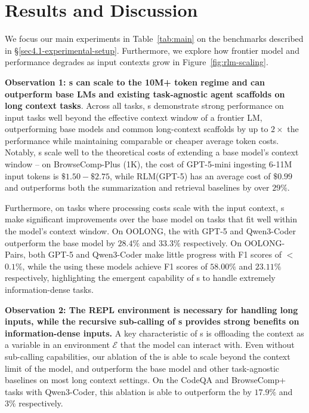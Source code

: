 \section{Results and Discussion} \label{sec4.3-results}
We focus our main experiments in Table~\ref{tab:main} on the benchmarks described in \S\ref{sec4.1-experimental-setup}. Furthermore, we explore how frontier model and \RLM{} performance degrades as input contexts grow in Figure~\ref{fig:rlm-scaling}.






\textbf{Observation 1: \RLM{}s can scale to the 10M+ token regime and can outperform base LMs and existing task-agnostic agent scaffolds on long context tasks}. Across all tasks, \RLM{}s demonstrate strong performance on input tasks well beyond the effective context window of a frontier LM, outperforming base models and common long-context scaffolds by up to $2\times$ the performance while maintaining comparable or cheaper average token costs. Notably, \RLM{}s scale well to the theoretical costs of extending a base model's context window -- on BrowseComp-Plus (1K), the cost of GPT-5-mini ingesting 6-11M input tokens is $\$1.50 - \$2.75$, while RLM(GPT-5) has an average cost of $\$0.99$ and outperforms both the summarization and retrieval baselines by over $29\%$. 

Furthermore, on tasks where processing costs scale with the input context, \RLM{}s make significant improvements over the base model on tasks that fit well within the model's context window. On OOLONG, the \RLM{} with GPT-5 and Qwen3-Coder outperform the base model by $28.4\%$ and $33.3\%$ respectively. On OOLONG-Pairs, both GPT-5 and Qwen3-Coder make little progress with F1 scores of $<$$0.1\%$, while the \RLM{} using these models achieve F1 scores of $58.00\%$ and $23.11\%$ respectively, highlighting the emergent capability of \RLM{}s to handle extremely information-dense tasks.


\textbf{Observation 2: The REPL environment is necessary for handling long inputs, while the recursive sub-calling of \RLM{}s provides strong benefits on information-dense inputs.} A key characteristic of \RLM{}s is offloading the context as a variable in an environment $\mathcal{E}$ that the model can interact with. Even without sub-calling capabilities, our ablation of the \RLM{} is able to scale beyond the context limit of the model, and outperform the base model and other task-agnostic baselines on most long context settings. On the CodeQA and BrowseComp+ tasks with Qwen3-Coder, this ablation is able to outperform the \RLM{} by $17.9\%$ and $3\%$ respectively. 

